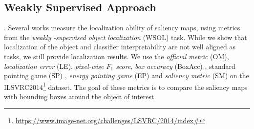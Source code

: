 \subsection{Weakly Supervised Approach}. 
\label{sec:oc_wsol}
Several works measure the localization ability of saliency maps, using metrics from the \emph{weakly
-supervised object localization} (WSOL) task. While we show that localization of the object and 
classifier interpretability are not well aligned as tasks, we still provide localization results. 
We use the \emph{official metric} (OM), \emph{localization error} (LE), \emph{pixel-wise $F_1$ 
score}, \emph{box accuracy} (BoxAcc) \autocite{choe2020evaluating}, standard pointing game (SP) 
\autocite{zhang2018top}, \emph{energy pointing game} (EP) \autocite{wang2020score} and 
\emph{saliency metric} (SM) \autocite{dabkowski2017real} on the ILSVRC2014\footnote{\url{
https://www.image-net.org/challenges/LSVRC/2014/index\#}} dataset. 
The goal of these metrics is to compare the saliency maps with bounding boxes around the object 
of interest. 


